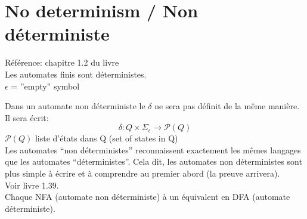 \documentclass[a4paper,12pt]{article}
\begin{document}
\section{No determinism / Non déterministe}
  Référence: chapitre 1.2 du livre\\
  Les automates finis sont déterministes.\\
  $\epsilon$ = ''empty'' symbol
  
  \begin{figure}[h!]
    \centering
  \end{figure}
  
  Dans un automate non déterministe le $\delta$ ne sera pas définit de la même manière.  Il sera écrit:
  $$\delta : Q \times \Sigma_{\epsilon} \rightarrow \mathcal P(Q)$$
  $\mathcal P(Q)$ liste d'états dans Q (set of states in Q)\\
  Les automates ``non déterministes'' reconnaissent exactement les mêmes langages que les automates ``déterministes''.  Cela dit, les automates non déterministes sont plus simple à écrire et à comprendre au premier abord (la preuve arrivera).\\
  Voir livre 1.39.\\
  Chaque NFA (automate non déterministe) à un équivalent en DFA (automate déterministe).
\end{document}
